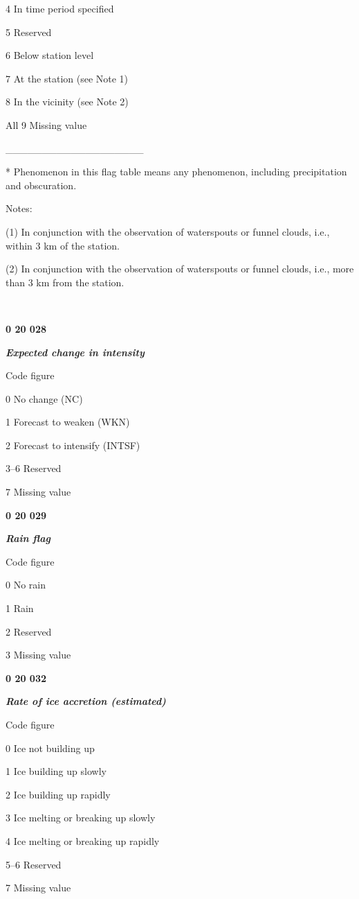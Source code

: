 4 In time period specified

5 Reserved

6 Below station level

7 At the station (see Note 1)

8 In the vicinity (see Note 2)

All 9 Missing value

\_\_\_\_\_\_\_\_\_\_\_\_\_\_\_\_\_\_\_

* Phenomenon in this flag table means any phenomenon, including precipitation and obscuration.

Notes:

(1) In conjunction with the observation of waterspouts or funnel clouds, i.e., within 3 km of the station.

(2) In conjunction with the observation of waterspouts or funnel clouds, i.e., more than 3 km from the station.

\textbf{\\
}

\textbf{0 20 028}

\emph{\textbf{Expected change in intensity}}

Code figure

0 No change (NC)

1 Forecast to weaken (WKN)

2 Forecast to intensify (INTSF)

3--6 Reserved

7 Missing value

\textbf{0 20 029}

\emph{\textbf{Rain flag}}

Code figure

0 No rain

1 Rain

2 Reserved

3 Missing value

\textbf{0 20 032}

\emph{\textbf{Rate of ice accretion (estimated)}}

Code figure

0 Ice not building up

1 Ice building up slowly

2 Ice building up rapidly

3 Ice melting or breaking up slowly

4 Ice melting or breaking up rapidly

5--6 Reserved

7 Missing value

